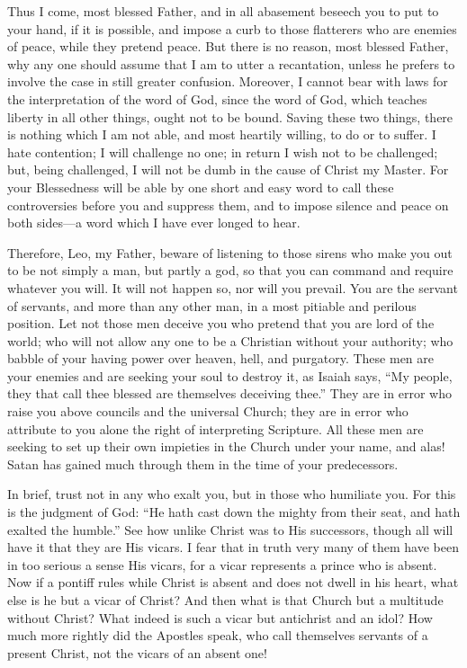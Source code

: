 Thus I come, most blessed Father, and in all abasement beseech you to put
to your hand, if it is possible, and impose a curb to those flatterers who
are enemies of peace, while they pretend peace. But there is no reason,
most blessed Father, why any one should assume that I am to utter a
recantation, unless he prefers to involve the case in still greater
confusion. Moreover, I cannot bear with laws for the interpretation of the
word of God, since the word of God, which teaches liberty in all other
things, ought not to be bound. Saving these two things, there is nothing
which I am not able, and most heartily willing, to do or to suffer. I hate
contention; I will challenge no one; in return I wish not to be
challenged; but, being challenged, I will not be dumb in the cause of
Christ my Master. For your Blessedness will be able by one short and easy
word to call these controversies before you and suppress them, and to
impose silence and peace on both sides—a word which I have ever
longed to hear.

Therefore, Leo, my Father, beware of listening to those sirens who make
you out to be not simply a man, but partly a god, so that you can command
and require whatever you will. It will not happen so, nor will you
prevail. You are the servant of servants, and more than any other man, in
a most pitiable and perilous position. Let not those men deceive you who
pretend that you are lord of the world; who will not allow any one to be a
Christian without your authority; who babble of your having power over
heaven, hell, and purgatory. These men are your enemies and are seeking
your soul to destroy it, as Isaiah says, ``My people, they that call thee
blessed are themselves deceiving thee.'' They are in error who raise you
above councils and the universal Church; they are in error who attribute
to you alone the right of interpreting Scripture. All these men are
seeking to set up their own impieties in the Church under your name, and
alas! Satan has gained much through them in the time of your predecessors.

In brief, trust not in any who exalt you, but in those who humiliate you.
For this is the judgment of God: ``He hath cast down the mighty from their
seat, and hath exalted the humble.'' See how unlike Christ was to His
successors, though all will have it that they are His vicars. I fear that
in truth very many of them have been in too serious a sense His vicars,
for a vicar represents a prince who is absent. Now if a pontiff rules
while Christ is absent and does not dwell in his heart, what else is he
but a vicar of Christ? And then what is that Church but a multitude
without Christ? What indeed is such a vicar but antichrist and an idol?
How much more rightly did the Apostles speak, who call themselves servants
of a present Christ, not the vicars of an absent one!

